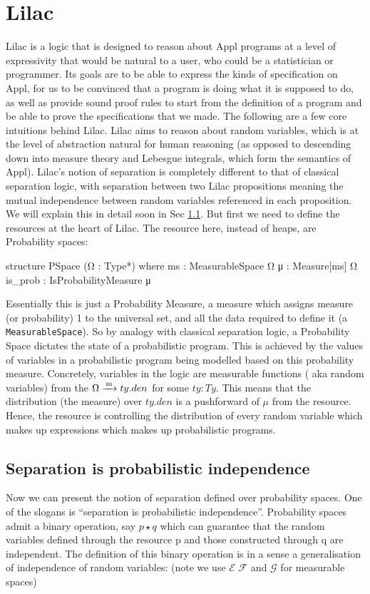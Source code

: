 \section{Lilac}
\label{lilac}
Lilac is a logic that is designed to reason about Appl programs at a level of expressivity that would be natural to a user, who could be a statistician or programmer.
Its goals are to be able to express the kinds of specification on Appl, for us to be convinced that a program is doing what it is supposed to do, as well as provide sound proof rules
to start from the definition of a program and be able to prove the specifications that we made.
The following are a few core intuitions behind Lilac. Lilac aims to reason about random variables, which is at the level of abstraction natural for
human reasoning (as opposed to descending down into measure theory and Lebesgue integrals, which form the semantics of Appl).
Lilac's notion of separation is completely different to that
of classical separation logic, with separation between two Lilac propositions meaning the mutual independence between random variables referenced in each proposition.
We will explain this in detail soon in Sec \ref{sec:sep-as-indep}. But first we need to define the resources at the heart of Lilac.
The resource here, instead of heaps, are Probability spaces:

\begin{leancode}
structure PSpace (Ω : Type*) where
  ms : MeasurableSpace Ω
  μ : Measure[ms] Ω
  is_prob : IsProbabilityMeasure μ
\end{leancode}

Essentially this is just a Probability Measure, a measure which assigns measure (or probability) 1 to the universal set, and
all the data required to define it (a \texttt{MeasurableSpace}). So by analogy with classical separation logic, a Probability
Space dictates the state of a probabilistic program. This is achieved by the values of variables in a probabilistic
program being modelled based on this probability measure. Concretely, variables in the logic are measurable functions (
aka random variables) from the \( \Omega \xrightarrow{\,\mathrm{m}\,} ty.den \) for some \( ty : Ty \). This means that the distribution (the measure) over \( ty.den\) is a 
pushforward of \(\mu\) from the resource. Hence, the resource is controlling the distribution of every random variable which makes up expressions which
makes up probabilistic programs.

\subsection{Separation is probabilistic independence}
\label{sec:sep-as-indep}
Now we can present the notion of separation defined over probability spaces. One of the slogans is ``separation is probabilistic independence''.
Probability spaces admit a binary operation, say \( p \star q \) which can guarantee that the random variables defined through the resource p and those constructed through
q are independent. The definition of this binary operation is in a sense a generalisation of independence of random variables: (note we use $\mathcal{E}$ $\mathcal{F}$ and $\mathcal{G}$ for
measurable spaces)


